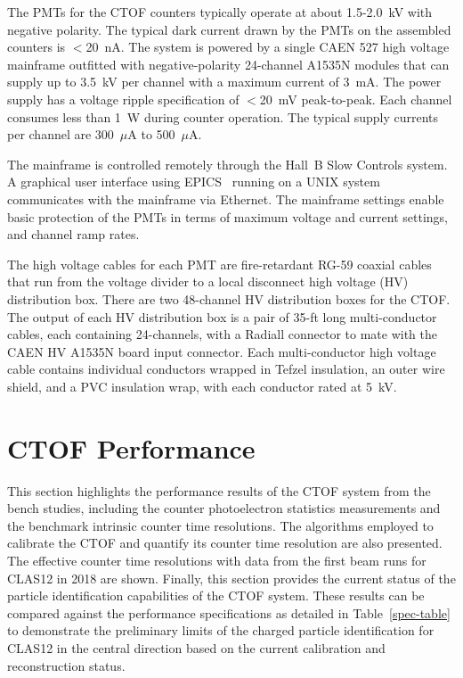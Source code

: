 \documentclass[3p,times,twocolumn]{elsarticle}
\begin{document}
The PMTs for the CTOF counters typically operate at about 1.5-2.0~kV with negative polarity. The typical
dark current drawn by the PMTs on the assembled counters is $<$20~nA. The system is powered by a
single CAEN 527 high voltage mainframe outfitted with negative-polarity 24-channel A1535N modules
that can supply up to 3.5~kV per channel with a maximum current of 3~mA. The power supply has a voltage
ripple specification of $<$20~mV peak-to-peak. Each channel consumes less than 1~W during counter
operation. The typical supply currents per channel are 300~$\mu$A to 500~$\mu$A.

The mainframe is controlled remotely through the Hall~B Slow Controls system. A graphical user interface
using EPICS~\cite{epics} running on a UNIX system communicates with the mainframe via Ethernet. The
mainframe settings enable basic protection of the PMTs in terms of maximum voltage and current settings,
and channel ramp rates.

The high voltage cables for each PMT are fire-retardant RG-59 coaxial cables that run from the voltage
divider to a local disconnect high voltage (HV) distribution box. There are two 48-channel HV distribution
boxes for the CTOF. The output of each HV distribution box is a pair of 35-ft long multi-conductor cables,
each containing 24-channels, with a Radiall connector to mate with the CAEN HV A1535N board input
connector. Each multi-conductor high voltage cable contains individual conductors wrapped in Tefzel
insulation, an outer wire shield, and a PVC insulation wrap, with each conductor rated at 5~kV.

\section{CTOF Performance}
\label{sec:performance}

This section highlights the performance results of the CTOF system from the bench studies, including
the counter photoelectron statistics measurements and the benchmark intrinsic counter time resolutions.
The algorithms employed to calibrate the CTOF and quantify its counter time resolution are also presented.
The effective counter time resolutions with data from the first beam runs for CLAS12 in 2018 are shown.
Finally, this section provides the current status of the particle identification capabilities of the CTOF system.
These results can be compared against the performance specifications as detailed in Table~\ref{spec-table}
to demonstrate the preliminary limits of the charged particle identification for CLAS12 in the central
direction based on the current calibration and reconstruction status.
\end{document}
